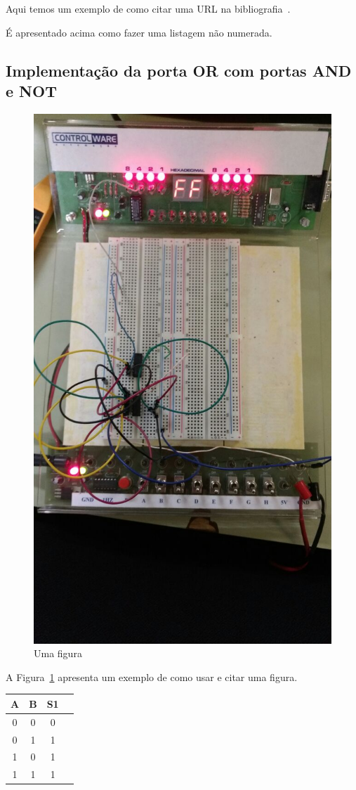 \documentclass[12pt]{article}
\begin{document}
Aqui temos um exemplo de como citar uma URL na bibliografia~\cite{systemverilog}.


É apresentado acima como fazer uma listagem não numerada.

\subsection{Implementação da porta OR com portas AND e NOT}
\label{sec:NOTAND}

\begin{figure}[H]
\centering
\includegraphics[width=.5\textwidth]{Porta_OR.jpeg}
\caption{Uma figura}
\label{fig:portaor}
\end{figure}

A Figura~\ref{fig:portaor} apresenta um exemplo de como usar e citar uma figura.

\begin{table}
	\centering
	\begin{tabular}{|c|c|c|c|}
	\cline{1-4}
	\multicolumn{1}{|c|}{A} & \multicolumn{1}{|c|}{B} & \multicolumn{1}{|c|}{S1}\\
	\hline
	0 & 0 & 0\\
	0 & 1 & 1\\
	1 & 0 & 1\\
	1 & 1 & 1\\
	\hline
	\end{tabular}
	\label{Porta OR}
\end{table}
\end{document}
